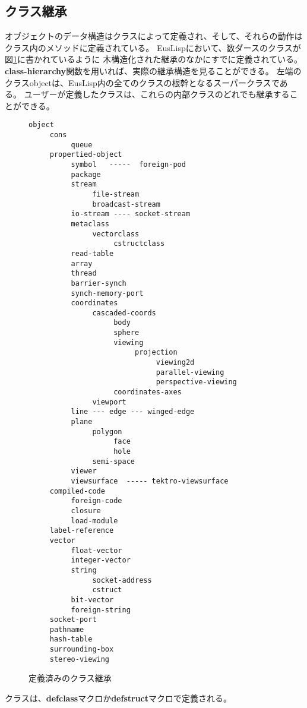 \subsection{クラス継承}

オブジェクトのデータ構造はクラスによって定義され、そして、それらの動作は
クラス内のメソッドに定義されている。
EusLispにおいて、数ダースのクラスが図\ref{ClassHierarchy}に書かれているように
木構造化された継承のなかにすでに定義されている。
{\bf class-hierarchy}関数を用いれば、実際の継承構造を見ることができる。
左端のクラスobjectは、EusLisp内の全てのクラスの根幹となるスーパークラスである。
ユーザーが定義したクラスは、これらの内部クラスのどれでも継承することができる。

\begin{figure}
\small
\begin{verbatim}
object
     cons
          queue
     propertied-object
          symbol   -----  foreign-pod
          package
          stream
               file-stream
               broadcast-stream
          io-stream ---- socket-stream
          metaclass
               vectorclass
                    cstructclass
          read-table
          array
          thread
          barrier-synch
          synch-memory-port
          coordinates
               cascaded-coords
                    body
                    sphere
                    viewing
                         projection
                              viewing2d
                              parallel-viewing
                              perspective-viewing
                    coordinates-axes
               viewport
          line --- edge --- winged-edge
          plane
               polygon
                    face
                    hole
               semi-space
          viewer
          viewsurface  ----- tektro-viewsurface
     compiled-code
          foreign-code
          closure
          load-module
     label-reference
     vector
          float-vector
          integer-vector
          string
               socket-address
               cstruct
          bit-vector
          foreign-string
     socket-port
     pathname
     hash-table
     surrounding-box
     stereo-viewing
\end{verbatim}
\normalsize
\caption{\label{ClassHierarchy}定義済みのクラス継承}
\end{figure}

クラスは、{\bf defclass}マクロか{\bf defstruct}マクロで定義される。

